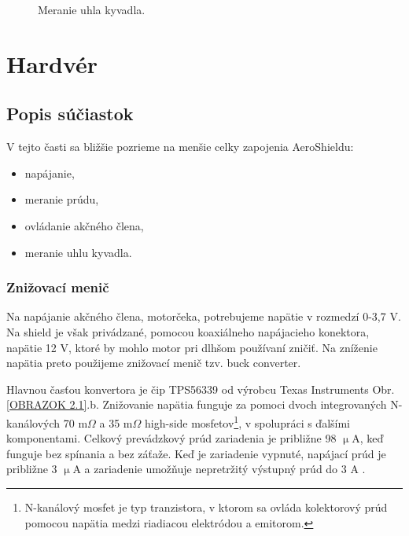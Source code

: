 \begin{figure}[!tbh]
	\hfill
	\hfill
	\hfill
	\caption{Meranie uhla kyvadla.}\label{OBRAZOK 2.1.2}
\end{figure}


\newpage
\section{Hardvér}
\subsection{Popis súčiastok}

V tejto časti sa bližšie pozrieme na menšie celky zapojenia AeroShieldu:
\begin{multicols}{2}
	\begin{itemize}
		\item napájanie,
		\item meranie prúdu,
		\item ovládanie akčného člena,
		\item meranie uhlu kyvadla.
	\end{itemize}
\end{multicols}


\subsubsection{Znižovací menič}
\label{nap}

Na napájanie akčného člena, motorčeka, potrebujeme napätie v rozmedzí 0-3,7 V. Na shield je však privádzané, pomocou koaxiálneho napájacieho konektora, napätie 12 V, ktoré by mohlo motor pri dlhšom používaní zničiť. Na zníženie napätia preto použijeme znižovací menič tzv. buck converter. 

Hlavnou časťou konvertora je čip TPS56339 od výrobcu Texas Instruments Obr. \ref{OBRAZOK 2.1}.b. Znižovanie napätia funguje za pomoci dvoch integrovaných N-kanálových 70 m$\Omega$ a 35 m$\Omega$ high-side mosfetov\footnote[4]{N-kanálový mosfet je typ tranzistora, v ktorom sa ovláda kolektorový prúd pomocou napätia medzi riadiacou elektródou a emitorom.}, v spolupráci s ďalšími komponentami. Celkový prevádzkový prúd zariadenia je približne 98 $\upmu$A, keď funguje bez spínania a bez záťaže. Keď je zariadenie vypnuté, napájací prúd je približne 3 $\upmu$A a zariadenie umožňuje nepretržitý výstupný prúd do 3 A \cite{buckobr}.

